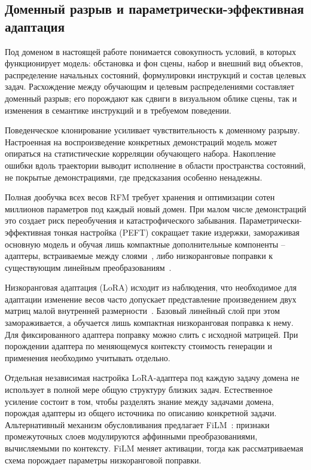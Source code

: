 \documentclass{misisarticle}
\begin{document}
\subsection{Доменный разрыв и параметрически-эффективная адаптация}

Под доменом в настоящей работе понимается совокупность условий, в которых функционирует модель: обстановка и фон сцены, набор и внешний вид объектов, распределение начальных состояний, формулировки инструкций и состав целевых задач. Расхождение между обучающим и целевым распределениями составляет доменный разрыв; его порождают как сдвиги в визуальном облике сцены, так и изменения в семантике инструкций и в требуемом поведении.

Поведенческое клонирование усиливает чувствительность к доменному разрыву. Настроенная на воспроизведение конкретных демонстраций модель может опираться на статистические корреляции обучающего набора. Накопление ошибки вдоль траектории выводит исполнение в области пространства состояний, не покрытые демонстрациями, где предсказания особенно ненадежны.

Полная дообучка всех весов RFM требует хранения и оптимизации сотен миллионов параметров под каждый новый домен. При малом числе демонстраций это создает риск переобучения и катастрофического забывания. Параметрически-эффективная тонкая настройка (PEFT) сокращает такие издержки, замораживая основную модель и обучая лишь компактные дополнительные компоненты -- адаптеры, встраиваемые между слоями~\cite{houlsby}, либо низкоранговые поправки к существующим линейным преобразованиям~\cite{lora}.

Низкоранговая адаптация (LoRA) исходит из наблюдения, что необходимое для адаптации изменение весов часто допускает представление произведением двух матриц малой внутренней размерности~\cite{lora}. Базовый линейный слой при этом замораживается, а обучается лишь компактная низкоранговая поправка к нему. Для фиксированного адаптера поправку можно слить с исходной матрицей. При порождении адаптера по меняющемуся контексту стоимость генерации и применения необходимо учитывать отдельно.

Отдельная независимая настройка LoRA-адаптера под каждую задачу домена не использует в полной мере общую структуру близких задач. Естественное усиление состоит в том, чтобы разделять знание между задачами домена, порождая адаптеры из общего источника по описанию конкретной задачи. Альтернативный механизм обусловливания предлагает FiLM~\cite{film}: признаки промежуточных слоев модулируются аффинными преобразованиями, вычисляемыми по контексту. FiLM меняет активации, тогда как рассматриваемая схема порождает параметры низкоранговой поправки.
\end{document}
